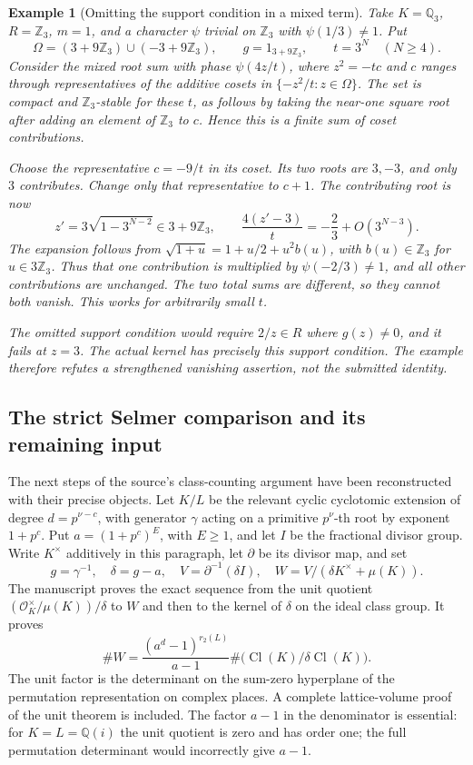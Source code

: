 \documentclass[11pt,a4paper]{article}
\newtheorem{example}[proposition]{Example}
\theoremstyle{remark}
\newcommand{\Z}{\mathbb Z}
\newcommand{\Q}{\mathbb Q}
\begin{document}
\begin{example}[Omitting the support condition in a mixed term]
Take $K=\Q_3$, $R=\Z_3$, $m=1$, and a character $\psi$
trivial on $\Z_3$ with $\psi(1/3)\ne1$. Put
\[
 \Omega=(3+9\Z_3)\cup(-3+9\Z_3),\qquad
 g=1_{3+9\Z_3},\qquad t=3^N\quad(N\ge4).
\]
Consider the mixed root sum with phase $\psi(4z/t)$,
where $z^2=-tc$ and $c$ ranges through representatives of
the additive cosets in $\{-z^2/t:z\in\Omega\}$.
The set is compact and $\Z_3$-stable for these $t$, as follows
by taking the near-one square root after adding an element
of $\Z_3$ to $c$. Hence this is a finite sum of coset
contributions.

Choose the representative $c=-9/t$ in its coset. Its two roots
are $3,-3$, and only $3$ contributes. Change only that
representative to $c+1$. The contributing root is now
\[
 z'=3\sqrt{1-3^{N-2}}\in3+9\Z_3,\qquad
 \frac{4(z'-3)}t=-\frac23+O(3^{N-3}).
\]
The expansion follows from
$\sqrt{1+u}=1+u/2+u^2b(u)$, with $b(u)\in\Z_3$
for $u\in3\Z_3$. Thus that one contribution is multiplied
by $\psi(-2/3)\ne1$, and all other contributions are
unchanged. The two total sums are different, so they
cannot both vanish. This works for arbitrarily small $t$.

The omitted support condition would require $2/z\in R$
where $g(z)\ne0$, and it fails at $z=3$. The actual kernel
has precisely this support condition. The example therefore
refutes a strengthened vanishing assertion, not the submitted
identity.
\end{example}

\subsection{The strict Selmer comparison and its remaining input}

The next steps of the source's class-counting argument have been
reconstructed with their precise objects. Let $K/L$ be the relevant
cyclic cyclotomic extension of degree $d=p^{\nu-c}$, with generator
$\gamma$ acting on a primitive $p^\nu$-th root by exponent $1+p^c$.
Put $a=(1+p^c)^E$, with $E\ge1$, and let $I$ be the fractional
divisor group. Write $K^\times$ additively in this paragraph,
let $\partial$ be its divisor map, and set
\[
 g=\gamma^{-1},\quad \delta=g-a,\quad
 V=\partial^{-1}(\delta I),\quad
 W=V/(\delta K^\times+\mu(K)).
\]
The manuscript proves the exact sequence from the unit quotient
$(\mathcal O_K^\times/\mu(K))/\delta$ to $W$ and then to the
kernel of $\delta$ on the ideal class group. It proves
\[
 \#W=\frac{(a^d-1)^{r_2(L)}}{a-1}
          \#\bigl(\operatorname{Cl}(K)/\delta\operatorname{Cl}(K)\bigr).
\]
The unit factor is the determinant on the sum-zero hyperplane of
the permutation representation on complex places. A complete
lattice-volume proof of the unit theorem is included. The factor
$a-1$ in the denominator is essential: for $K=L=\Q(i)$ the
unit quotient is zero and has order one; the full permutation
determinant would incorrectly give $a-1$.
\end{document}

